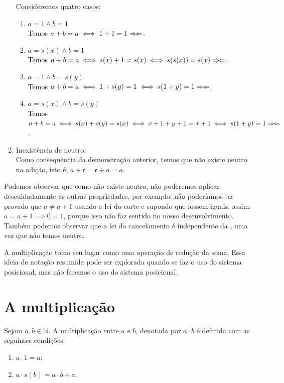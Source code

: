 \documentclass[../main.tex]{subfiles}
\begin{document}
\begin{dem}
\begin{enumerate}[label=(\roman*)]
            Consideremos quatro casos:
            \begin{enumerate}[label=(\arabic*)]
            \item $a=1 \land b=1$ \\
                Temos $a+b=a \iff 1+1=1 \Rightarrow\!\Leftarrow$. 
            \item $a=s(x) \land b=1$ \\
                Temos $a+b=a \iff s(x) + 1 = s(x) \iff s(s(x)) = s(x) \Rightarrow\!\Leftarrow$. 
            \item $a=1 \land b=s(y)$ \\
                Temos $a+b=a \iff 1+ s(y) = 1 \iff s(1+y) = 1 \Rightarrow\!\Leftarrow$. 
            \item $a=s(x) \land b=s(y)$ \\
                Temos $a+b=a \iff s(x) + s(y) = s(x) \iff x + 1 + y + 1 = x + 1 \iff s(1 + y) = 1 \Rightarrow\!\Leftarrow$.
            \end{enumerate}
    
        \item Inexistência de neutro: \\
            Como consequência da demonstração anterior, temos que não existe neutro na adição, isto é, $a + \mathfrak{e} = \mathfrak{e} + a = a$.
    \end{enumerate}
\end{dem}
 
Podemos observar que como não existe neutro, não poderemos aplicar descuidadamente as outras propriedades, por exemplo: não poderíamos ter provado que $a \neq a + 1 $ usando a lei do corte e supondo que fossem iguais, assim: $a = a+ 1 \implies 0 = 1$, porque isso não faz sentido no nosso desenvolvimento. Também podemos observar que a lei do cancelamento é independente da , uma vez que não temos neutro.

A multiplicação toma seu lugar como uma operação de redução da soma. Essa ideia de notação resumida pode ser explorada quando se faz o uso do sistema posicional, mas não faremos o uso do sistema posicional. 

\section{A multiplicação}
\begin{defi}\label{nat-def-multiplicacao}
    Sejam $a, b \in \mathbb{N}$. A multiplicação entre $a$ e $b$, denotada por $a \cdot b$ é definida com as seguintes condições: 
	\begin{enumerate}[label=(\roman*)]
		\item $a \cdot 1 = a$;
		\item $a \cdot s(b) = a \cdot b + a$.
	\end{enumerate}
\end{defi}
\end{document}
